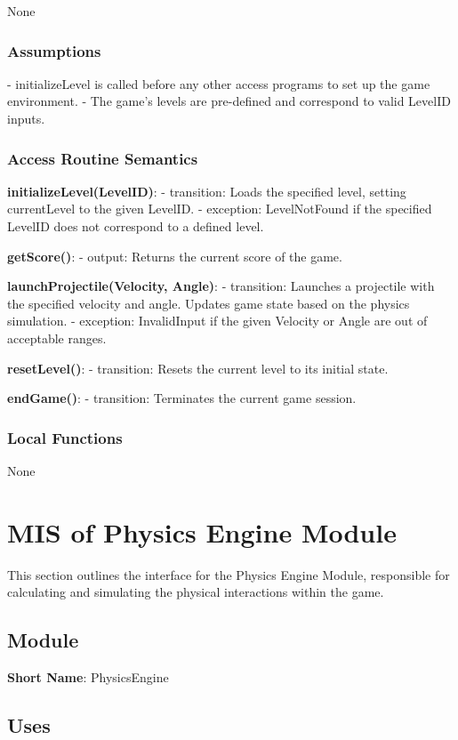 \documentclass[12pt]{article}
\begin{document}
None

\subsubsection{Assumptions}

- initializeLevel is called before any other access programs to set up the game environment.
- The game's levels are pre-defined and correspond to valid LevelID inputs.

\subsubsection{Access Routine Semantics}

\textbf{initializeLevel(LevelID)}:
- transition: Loads the specified level, setting currentLevel to the given LevelID.
- exception: LevelNotFound if the specified LevelID does not correspond to a defined level.

\textbf{getScore()}:
- output: Returns the current score of the game.

\textbf{launchProjectile(Velocity, Angle)}:
- transition: Launches a projectile with the specified velocity and angle. Updates game state based on the physics simulation.
- exception: InvalidInput if the given Velocity or Angle are out of acceptable ranges.

\textbf{resetLevel()}:
- transition: Resets the current level to its initial state.

\textbf{endGame()}:
- transition: Terminates the current game session.

\subsubsection{Local Functions}

None
\section{MIS of Physics Engine Module}

This section outlines the interface for the Physics Engine Module, responsible for calculating and simulating the physical interactions within the game.

\subsection{Module}

\textbf{Short Name}: PhysicsEngine

\subsection{Uses}
\end{document}
